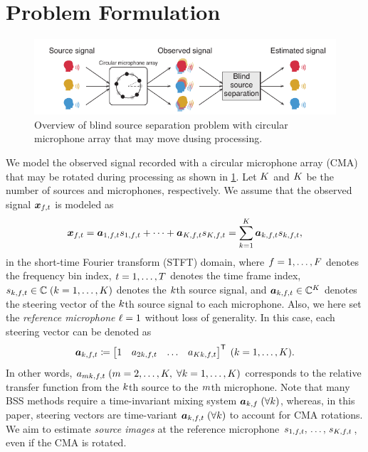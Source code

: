 \documentclass[sip,biber]{now-journal}
\begin{document}
\section{Problem Formulation}\label{sec:problem}
\begin{figure}[t]
  \includegraphics{figures/diagrams/bss.pdf}%
  \caption{Overview of blind source separation problem with circular microphone array that may move dusing processing.}%
  \label{fig:bss}
\end{figure}
We model the observed signal recorded with a circular microphone array (CMA) that may be rotated during processing as shown in \cref{fig:bss}.
Let $K$ and $K$ be the number of sources and microphones, respectively.
We assume that the observed signal $\Obs _{\ft}$ is modeled as
\begin{equation}
  \Obs _{\ft} = \steer _{1,\ft} \sig _{1,\ft} + \dots + \steer _{\Src,\ft} \sig _{\Src,\ft} = \sum _{\src=1} ^{\Src} \steer _{\src,\ft} \sig _{\src,\ft},\label{eq:mix}
\end{equation}
in the short-time Fourier transform (STFT) domain,
where $f = 1, \dots, F$ denotes the frequency bin index,
$t = 1, \dots, T$ denotes the time frame index,
$\sig _{\src,\ft} \in \C\; (\src = 1, \dots, \Src)$ denotes the $k$th source signal,
and $\steer _{\src,\ft} \in \C ^{\Mic}$ denotes the steering vector of the $k$th source signal to each microphone.
Also, we here set the \emph{reference microphone} $\ell = 1$ without loss of generality.
In this case, each steering vector can be denoted as
\begin{equation}
  \steer _{\src,\ft} \coloneqq \begin{bmatrix} 1 & \str _{2\src,\ft} & \dots & \str _{\Mic\src,\ft} \end{bmatrix} ^{\top}\; (\src = 1, \dots, \Src).
\end{equation}
In other words, $\str _{\mic\src,\ft} \; (\mic = 2, \dots, \Mic,\; \forall \src = 1, \dots, \Src)$ corresponds to the relative transfer function from the $k$th source to the $m$th microphone.
Note that many BSS methods require a time-invariant mixing system $\bm{a} _{k,f}\; (\forall k)$,
whereas, in this paper, steering vectors are time-variant $\steer _{\src,\ft}\; (\forall \src)$ to account for CMA rotations.
We aim to estimate \emph{source images} at the reference microphone $\sig _{1,\ft},\, \dots,\, \sig _{\Src,\ft}$, even if the CMA is rotated.
\end{document}
